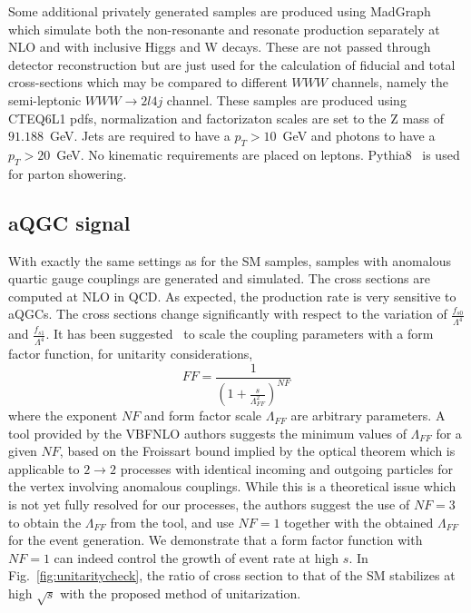 Some additional privately generated samples are produced using {\sc MadGraph}~\cite{Alwall_madgraph} which simulate both the non-resonante and resonate production 
separately at NLO and with inclusive Higgs and W decays. These are not passed through detector reconstruction but are just
used for the calculation of fiducial and total cross-sections which may be compared to different $WWW$ channels, namely the semi-leptonic
$WWW\rightarrow 2l4j$ channel. These samples are produced using CTEQ6L1 pdfs, normalization and factorizaton scales
are set to the Z mass of $91.188$~GeV. Jets are required to have a $p_{T} > 10$~GeV and photons to have a $p_{T}>20$~GeV.  No kinematic
requirements are placed on leptons. {\sc Pythia8}~\cite{Sjostrand:2007gs}  is used for parton showering.



\subsection{aQGC signal}
With exactly the same settings as for the SM samples, samples with
anomalous quartic gauge couplings are generated and simulated.  The
cross sections are computed at NLO in QCD. As expected, the production
rate is very sensitive to aQGCs. The cross sections change
significantly with respect to the variation of
$\frac{f_{s0}}{\Lambda^4}$ and $\frac{f_{s1}}{\Lambda^4}$. It has been
suggested~\cite{aQGC:Twiki} to scale the coupling parameters with a form factor
function, for unitarity considerations,
\[
FF = \frac{1}{\left(1 + \frac{s}{\Lambda_{FF}^2}\right)^{NF}}
\]
where the exponent $NF$ and form factor scale $\Lambda_{FF}$ are
arbitrary parameters.  A tool provided by the {\sc
  VBFNLO} authors suggests the minimum values of $\Lambda_{FF}$
for a given $NF$, based on the Froissart bound implied by the optical
theorem which is applicable to $2\rightarrow 2$ processes with
identical incoming and outgoing particles for the vertex involving
anomalous couplings.  While this is a theoretical issue which is not
yet fully resolved for our processes, the authors suggest the use of $NF =
3$ to obtain the $\Lambda_{FF}$ from the tool, and use $NF = 1$
together with the obtained $\Lambda_{FF}$ for the event generation.
We demonstrate that a form factor function with $NF=1$ can indeed
control the growth of event rate at high $s$. In
Fig.~\ref{fig:unitaritycheck}, the ratio of cross section to that of
the SM stabilizes at high $\sqrt{s}$ with the proposed method of
unitarization.
